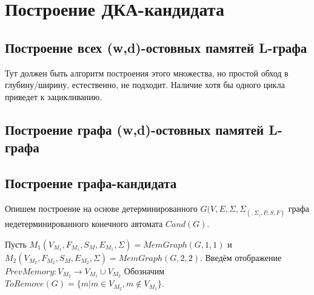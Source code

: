 \chapter{Построение ДКА-кандидата} \label{chapt3}

\section{Построение всех (w,d)-остовных памятей L-графа} 
\label{sect3_1}
Тут должен быть алгоритм построения этого множества, но простой обход в глубину/ширину, естественно, не подходит. Наличие хотя бы одного цикла приведет к зацикливанию.

\section{Построение графа (w,d)-остовных памятей L-графа}
\label{sect3_2}


\section{Построение графа-кандидата}
Опишем построение на основе детерминированного  $G(V,E,\Sigma,\Sigma_(,\Sigma_),P,S,F)$ графа недетерминированного конечного автомата $Cand(G)$.

Пусть $M_1(V_{M_1},F_{M_1},S_M,E_{M_1},\Sigma) = MemGraph(G,1,1)$ и $M_2(V_{M_2},F_{M_2},S_M,E_{M_2},\Sigma) = MemGraph(G,2,2)$. 
Введём отображение $PrevMemory: V_{M_2} \rightarrow V_{M_1} \cup V_{M_2} $
Обозначим $ToRemove(G) = \{m|m \in V_{M_2}, m \not\in V_{M_1}\}$. 

\clearpage